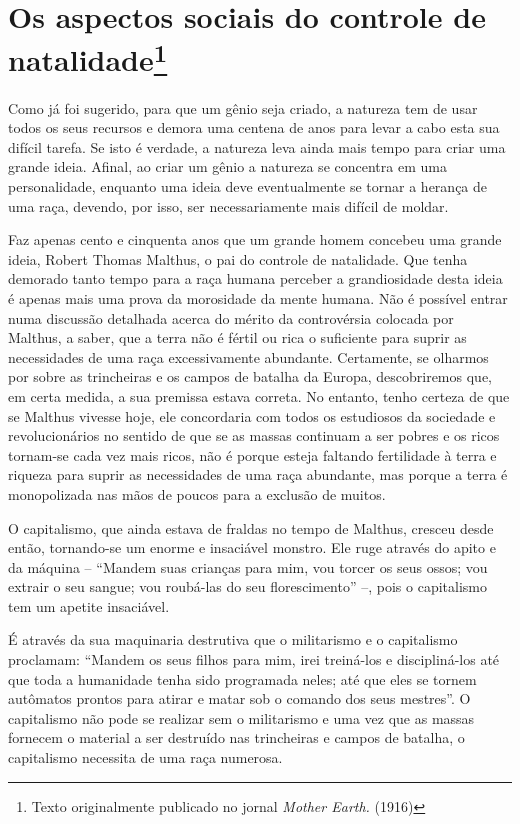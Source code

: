 \chapter[Os aspectos sociais do controle de natalidade (1916)]{Os aspectos sociais do controle de natalidade\footnote[*]{Texto
  originalmente publicado no jornal \emph{Mother Earth.} (1916)}}

Como já foi sugerido, para que um gênio seja criado, a natureza tem de
usar todos os seus recursos e demora uma centena de anos para levar a
cabo esta sua difícil tarefa. Se isto é verdade, a natureza leva ainda
mais tempo para criar uma grande ideia. Afinal, ao criar um gênio a
natureza se concentra em uma personalidade, enquanto uma ideia deve
eventualmente se tornar a herança de uma raça, devendo, por isso, ser
necessariamente mais difícil de moldar.

Faz apenas cento e cinquenta anos que um grande homem concebeu uma
grande ideia, Robert Thomas Malthus, o pai do controle de natalidade.
Que tenha demorado tanto tempo para a raça humana perceber a
grandiosidade desta ideia é apenas mais uma prova da morosidade da mente
humana. Não é possível entrar numa discussão detalhada acerca do mérito
da controvérsia colocada por Malthus, a saber, que a terra não é fértil
ou rica o suficiente para suprir as necessidades de uma raça
excessivamente abundante. Certamente, se olharmos por sobre as
trincheiras e os campos de batalha da Europa, descobriremos que, em
certa medida, a sua premissa estava correta. No entanto, tenho certeza
de que se Malthus vivesse hoje, ele concordaria com todos os estudiosos
da sociedade e revolucionários no sentido de que se as massas continuam
a ser pobres e os ricos tornam-se cada vez mais ricos, não é porque
esteja faltando fertilidade à terra e riqueza para suprir as
necessidades de uma raça abundante, mas porque a terra é monopolizada
nas mãos de poucos para a exclusão de muitos.

O capitalismo, que ainda estava de fraldas no tempo de Malthus, cresceu
desde então, tornando-se um enorme e insaciável monstro. Ele ruge
através do apito e da máquina -- ``Mandem suas crianças para mim, vou
torcer os seus ossos; vou extrair o seu sangue; vou roubá-las do seu
florescimento'' --, pois o capitalismo tem um apetite insaciável.

É através da sua maquinaria destrutiva que o militarismo e o capitalismo
proclamam: ``Mandem os seus filhos para mim, irei treiná-los e
discipliná-los até que toda a humanidade tenha sido programada neles;
até que eles se tornem autômatos prontos para atirar e matar sob o
comando dos seus mestres''. O capitalismo não pode se realizar sem o
militarismo e uma vez que as massas fornecem o material a ser destruído
nas trincheiras e campos de batalha, o capitalismo necessita de uma raça
numerosa.

